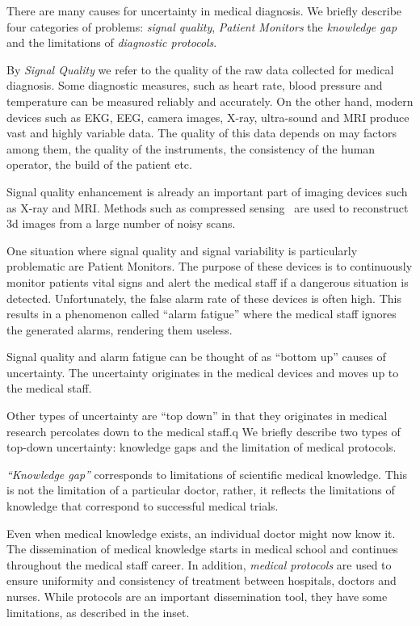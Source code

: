 \documentclass[11pt]{pnas-new}
\begin{document}
There are many causes for uncertainty in medical diagnosis. We briefly
describe four categories of problems: {\em signal quality}, {\em
  Patient Monitors} the {\em knowledge gap} and the limitations of {\em
  diagnostic protocols}.


By {\em Signal Quality} we refer to the quality of the raw data
collected for medical diagnosis. Some diagnostic measures, such
as heart rate, blood pressure and temperature can be measured reliably
and accurately. On the other hand, modern
devices such as EKG, EEG, camera images, X-ray, ultra-sound and MRI
produce vast and highly variable data. The quality of this data
depends on may factors among them, the quality of the instruments, the
consistency of the human operator, the build of the patient etc.

Signal quality enhancement is already an important part of imaging
devices such as X-ray and MRI. Methods such as compressed
sensing~\cite{} are used to reconstruct 3d images from a large number
of noisy scans.


One situation where signal quality and signal variability is
particularly problematic are Patient Monitors. The purpose of these
devices is to continuously monitor patients vital signs and alert the
medical staff if a dangerous situation is detected. Unfortunately, the
false alarm rate of these devices is often high. This results in a
phenomenon called ``alarm fatigue'' where the medical staff ignores
the generated alarms, rendering them useless.

Signal quality and alarm fatigue can be thought of as ``bottom up''
causes of uncertainty. The uncertainty originates in the medical
devices and moves up to the medical staff.

Other types of uncertainty are ``top down'' in that they originates in medical research percolates down to the medical staff.q We briefly
describe two types of top-down uncertainty: knowledge gaps and the
limitation of medical protocols.

{\em ``Knowledge gap''} corresponds to limitations of scientific medical
knowledge. This is not the limitation of a particular doctor, rather,
it reflects the limitations of knowledge that correspond to successful
medical trials.


Even when medical knowledge exists, an individual doctor might now
know it. The dissemination of medical knowledge starts in medical
school and continues throughout the medical staff career. In addition,
{\em medical protocols} are used to ensure uniformity and
consistency of treatment between hospitals, doctors and nurses. While
protocols are an important dissemination tool, they have some limitations, 
as described in the inset.
~\\
\end{document}
